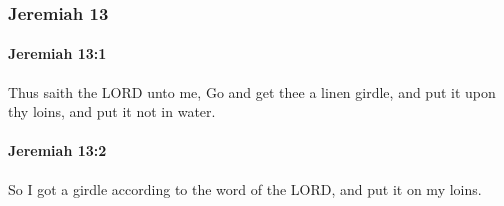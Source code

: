 	\subsubsection{Jeremiah 13} %
		\label{JEREMIAH-13}

		\paragraph{Jeremiah 13:1} %
			\label{JEREMIAH-13-1}

			Thus saith the LORD unto me, Go and get thee a linen girdle, and put it upon thy loins, and put it not in water.


		\paragraph{Jeremiah 13:2} %
			\label{JEREMIAH-13-2}

			So I got a girdle according to the word of the LORD, and put it on my loins.

